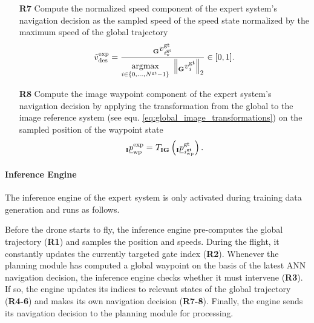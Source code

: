 \begin{itemize}
    


    \item [\textbf{R7}] Compute the normalized speed component
    of the expert system's navigation decision
    as the sampled speed of the speed state
    normalized by the maximum speed of the global trajectory
    \begin{equation}
        \speed[\norm]{\expert}{\desired}{}{}
        = 
        \frac{
            \speed[]{\glotraj}{\idx[]{\glotraj}{v}{}{}}{\grs}{}
        }
        {
            \argmax{i \in \{0, ..., \num[]{\glotraj}{}{}{} - 1\}}
            \left\| 
                \speed[]{\glotraj}{\idx[]{}{}{}{}}{\grs}{}
            \right\|_2
        }  
        \in [0,1].
    \end{equation}


    
    
    
    \item [\textbf{R8}] Compute the image waypoint component
    of the expert system's navigation decision
    by applying the transformation
    from the global to the image reference system (see equ. \ref{eq:global_image_transformations})
    on the sampled position of the waypoint state 
    \begin{equation}
        \pos[]{\expert}{\wayp}{\irs}{}
        =
        \trafo[]{}{\irs\grs}{}{} \left(
            \pos[]{\glotraj}{\idx[]{\glotraj}{\wayp}{}{}}{\irs}{}
        \right)
        .
    \end{equation}

\end{itemize}





\paragraph*{Inference Engine} $\ $\\
The inference engine of the expert system is only activated 
during training data generation and runs as follows.

Before the drone starts to fly,
the inference engine pre-computes the global trajectory (\textbf{R1})
and samples the position and speeds.
During the flight, it constantly updates the currently targeted
gate index (\textbf{R2}).
Whenever the planning module has computed a global waypoint on the basis
of the latest ANN navigation decision,
the inference engine checks whether it must intervene (\textbf{R3}).
If so, the engine updates its indices to relevant states of the global trajectory
(\textbf{R4-6})
and makes its own navigation decision (\textbf{R7-8}).
Finally, the engine sends its navigation decision to the planning module for processing.





